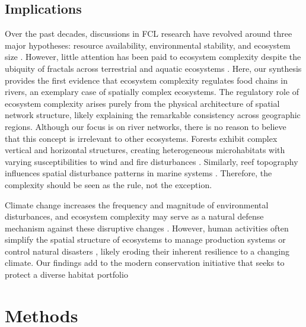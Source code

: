 \documentclass[11pt, class=article, crop=false]{standalone}
\begin{document}
\subsection{Implications}
Over the past decades, discussions in FCL research have revolved around three major hypotheses: resource availability, environmental stability, and ecosystem size \citep{oksanen_exploitation_1981, pimm_number_1977, schoener_food_1989}.
However, little attention has been paid to ecosystem complexity despite the ubiquity of fractals across terrestrial \citep{turner_landscape_2015} and aquatic ecosystems \citep{rodriguez-iturbe_fractal_2001}.
Here, our synthesis provides the first evidence that ecosystem complexity regulates food chains in rivers, an exemplary case of spatially complex ecosystems.
The regulatory role of ecosystem complexity arises purely from the physical architecture of spatial network structure, likely explaining the remarkable consistency across geographic regions.
Although our focus is on river networks, there is no reason to believe that this concept is irrelevant to other ecosystems.
Forests exhibit complex vertical and horizontal structures, creating heterogeneous microhabitats with varying susceptibilities to wind and fire disturbances \citep{peterson_contagious_2002, cansler_climate_2014}.
Similarly, reef topography influences spatial disturbance patterns in marine systems \citep{connell_30year_1997}.
Therefore, the complexity should be seen as the rule, not the exception.

Climate change increases the frequency and magnitude of environmental disturbances, and ecosystem complexity may serve as a natural defense mechanism against these disruptive changes \citep{terui_metapopulation_2018, terui_emergent_2021, pomeranz_ecosystem_2023}.
However, human activities often simplify the spatial structure of ecosystems to manage production systems or control natural disasters \citep{turner_landscape_2015, grill_mapping_2019, elmore_disappearing_2008}, likely eroding their inherent resilience to a changing climate.
Our findings add to the modern conservation initiative that seeks to protect a diverse habitat portfolio

\newpage

\section{Methods}
\end{document}
